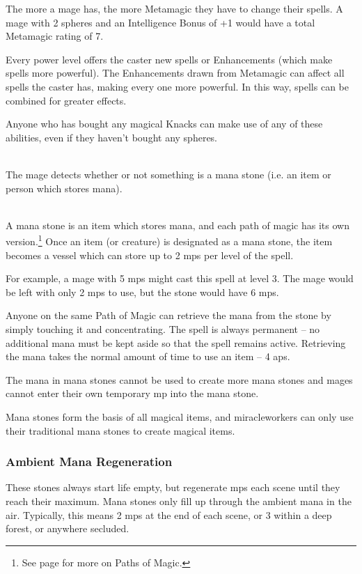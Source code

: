 \begin{multicols}{2}


\noindent
The more  a mage has, the more Metamagic they have to change their spells.
A mage with 2 spheres and an Intelligence Bonus of +1 would have a total Metamagic rating of 7.

Every power level offers the caster new spells or Enhancements (which make spells more powerful).
The Enhancements drawn from Metamagic can affect all spells the caster has, making every one more powerful.
In this way, spells can be combined for greater effects.

Anyone who has bought any magical Knacks can make use of any of these abilities, even if they haven't bought any spheres.

\spelllevel

\\
The mage detects whether or not something is a mana stone (i.e. an item or person which stores mana).

\\
A mana stone is an item which stores mana, and each path of magic has its own version.\footnote{See page \pageref{magic_paths} for more on Paths of Magic.}
Once an item (or creature) is designated as a mana stone, the item becomes a vessel which can store up to 2 \glspl{mp} per level of the spell.

For example, a mage with 5 \glspl{mp} might cast this spell at level 3.
The mage would be left with only 2 \glspl{mp} to use, but the stone would have 6 \glspl{mp}.

Anyone on the same Path of Magic can retrieve the mana from the stone by simply touching it and concentrating.
The spell is always permanent -- no additional mana must be kept aside so that the spell remains active.
Retrieving the mana takes the normal amount of time to use an item -- 4 \glspl{ap}.

The mana in mana stones cannot be used to create more mana stones and mages cannot enter their own temporary \gls{mp} into the mana stone.

Mana stones form the basis of all magical items, and \glspl{miracleworker} can only use their traditional mana stones to create magical items.

\subsubsection{Ambient Mana Regeneration}
\label{ambientmana}
These stones always start life empty, but regenerate \glspl{mp} each scene until they reach their maximum.
Mana stones only fill up through the ambient mana in the air.
Typically, this means 2 \glspl{mp} at the end of each scene, or 3 within a deep forest, or anywhere secluded.


\end{multicols}
